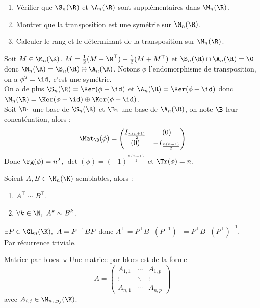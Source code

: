 \documentclass[11pt]{article}
\begin{document}
\begin{ex}{}{}
    \begin{enumerate}
        \item Vérifier que $\S_n(\R)$ et $\A_n(\R)$ sont supplémentaires dans $\M_n(\R)$.
        \item Montrer que la transposition est une symétrie sur $\M_n(\R)$.
        \item Calculer le rang et le déterminant de la transposition sur $\M_n(\R)$.
    \end{enumerate}
    \tcblower
     Soit $M\in\M_n(\K)$. $M=\frac{1}{2}(M-\M^\top) + \frac{1}{2}(M+M^\top)$ et $\S_n(\R)\cap\A_n(\R)=\0$ donc $\M_n(\R)=\S_n(\R)\oplus \A_n(\R)$.
     Notons $\phi$ l'endomorphisme de transposition, on a $\phi^2=\id$, c'est une symétrie.\\
     On a de plus $\S_n(\R)=\Ker(\phi-\id)$ et $\A_n(\R)=\Ker(\phi+\id)$ donc $\M_n(\R)=\Ker(\phi-\id)\oplus\Ker(\phi+\id)$.\\
    Soit $\B_1$ une base de $\S_n(\R)$ et $\B_2$ une base de $\A_n(\R)$, on note $\B$ leur concaténation, alors :
    \begin{equation*}
        \Mat_{\B}(\phi) = \begin{pmatrix} I_{\frac{n(n+1)}{2}} & (0) \\ (0) & -I_\frac{n(n-1)}{2}\end{pmatrix}
    \end{equation*}
    Donc $\rg(\phi)=n^2$, $\det(\phi)=(-1)^{\frac{n(n-1)}{2}}$ et $\Tr(\phi)=n$.
\end{ex}

\vspace*{-0.7cm}

\begin{prop}{}{}
    Soient $A,B\in\M_n(\K)$ semblables, alors :
    \begin{enumerate}
        \item $A^\top\sim B^\top$.
        \item $\forall k \in \N, ~ A^k \sim B^k$.
    \end{enumerate} 
    \tcblower
     $\exists P \in \GL_n(\K), ~ A=P^{-1}BP$ donc $A^\top=P^\top B^\top(P^{-1})^\top=P^\top B^\top(P^\top)^{-1}$.\\
     Par récurrence triviale.
\end{prop}

\begin{defi}{Matrice par blocs. $\star$}{}
    Une matrice par blocs est de la forme
    \begin{equation*}
        A=\begin{pmatrix}
            A_{1,1} & \cdots & A_{1,p}\\
            \vdots & \ddots & \vdots\\
            A_{n,1} & \cdots & A_{n,p}
        \end{pmatrix}
    \end{equation*}
    avec $A_{i,j}\in\M_{n_i,p_j}(\K)$.
\end{defi}
\end{document}
